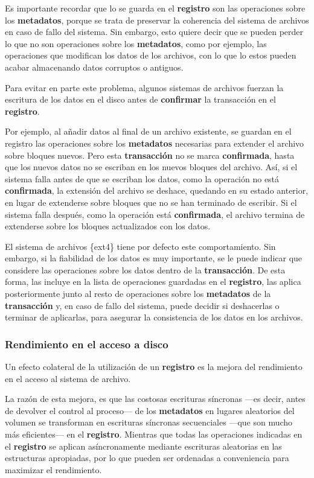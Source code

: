 Es importante recordar que lo se guarda en el \textbf{registro} son las
operaciones sobre los \textbf{metadatos}, porque se trata de preservar
la coherencia del sistema de archivos en caso de fallo del sistema. Sin
embargo, esto quiere decir que se pueden perder lo que no son
operaciones sobre los \textbf{metadatos}, como por ejemplo, las
operaciones que modifican los datos de los archivos, con lo que lo estos
pueden acabar almacenando datos corruptos o antiguos.

Para evitar en parte este problema, algunos sistemas de archivos fuerzan
la escritura de los datos en el disco antes de \textbf{confirmar} la
transacción en el \textbf{registro}.

Por ejemplo, al añadir datos al final de un archivo existente, se
guardan en el registro las operaciones sobre los \textbf{metadatos}
necesarias para extender el archivo sobre bloques nuevos. Pero esta
\textbf{transacción} no se marca \textbf{confirmada}, hasta que los
nuevos datos no se escriban en los nuevos bloques del archivo. Así, si
el sistema falla antes de que se escriban los datos, como la operación
no está \textbf{confirmada}, la extensión del archivo se deshace,
quedando en su estado anterior, en lugar de extenderse sobre bloques que
no se han terminado de escribir. Si el sistema falla después, como la
operación está \textbf{confirmada}, el archivo termina de extenderse
sobre los bloques actualizados con los datos.

El sistema de archivos \{ext4\} tiene por defecto este comportamiento.
Sin embargo, si la fiabilidad de los datos es muy importante, se le
puede indicar que considere las operaciones sobre los datos dentro de la
\textbf{transacción}. De esta forma, las incluye en la lista de
operaciones guardadas en el \textbf{registro}, las aplica posteriormente
junto al resto de operaciones sobre los \textbf{metadatos} de la
\textbf{transacción} y, en caso de fallo del sistema, puede decidir si
deshacerlas o terminar de aplicarlas, para asegurar la consistencia de
los datos en los archivos.

\subsubsection{Rendimiento en el acceso a
disco}\label{_rendimiento_en_el_acceso_a_disco}

Un efecto colateral de la utilización de un \textbf{registro} es la
mejora del rendimiento en el acceso al sistema de archivo.

La razón de esta mejora, es que las costosas escrituras síncronas ---es
decir, antes de devolver el control al proceso--- de los
\textbf{metadatos} en lugares aleatorios del volumen se transforman en
escrituras síncronas secuenciales ---que son mucho más eficientes--- en
el \textbf{registro}. Mientras que todas las operaciones indicadas en el
\textbf{registro} se aplican asíncronamente mediante escrituras
aleatorias en las estructuras apropiadas, por lo que pueden ser
ordenadas a conveniencia para maximizar el rendimiento.

